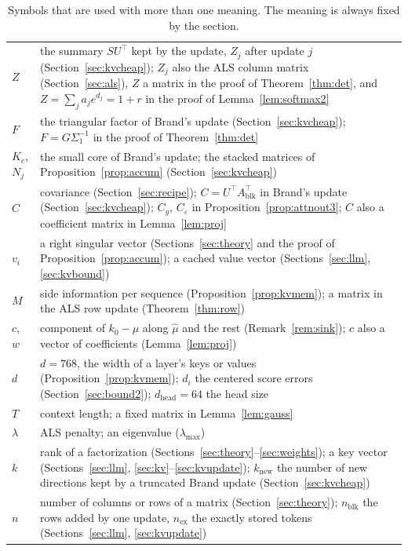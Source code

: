 \documentclass[10pt]{article}
\theoremstyle{plain}
\theoremstyle{definition}
\theoremstyle{remark}
\newcommand{\T}{^{\top}}
\newcommand{\dhead}{d_{\mathrm{head}}}
\begin{document}
\begin{table}[!htb]
\begin{tabularx}{\textwidth}{@{}>{\raggedright}p{1.6cm} >{\raggedright\arraybackslash}X@{}}
$Z$ & the summary $SU\T$ kept by the update, $Z_j$ after update $j$ (Section~\ref{sec:kvcheap}); $Z_j$ also the ALS column matrix (Section~\ref{sec:als}), $Z$ a matrix in the proof of Theorem~\ref{thm:det}, and $Z=\sum_ja_je^{d_j}=1+r$ in the proof of Lemma~\ref{lem:softmax2}\\
$F$ & the triangular factor of Brand's update (Section~\ref{sec:kvcheap}); $F=G\Sigma_1^{-1}$ in the proof of Theorem~\ref{thm:det}\\
$K_c$, $N_j$ & the small core of Brand's update; the stacked matrices of Proposition~\ref{prop:accum} (Section~\ref{sec:kvcheap})\\
$C$ & covariance (Section~\ref{sec:recipe}); $C=U\T A_{\mathrm{blk}}\T$ in Brand's update (Section~\ref{sec:kvcheap}); $C_y$, $C_\varepsilon$ in Proposition~\ref{prop:attnout3}; $C$ also a coefficient matrix in Lemma~\ref{lem:proj}\\
$v_i$ & a right singular vector (Sections~\ref{sec:theory} and the proof of Proposition~\ref{prop:accum}); a cached value vector (Sections~\ref{sec:llm}, \ref{sec:kvbound})\\
$M$ & side information per sequence (Proposition~\ref{prop:kvmem}); a matrix in the ALS row update (Theorem~\ref{thm:row})\\
$c$, $w$ & component of $k_0-\mu$ along $\hat\mu$ and the rest (Remark~\ref{rem:sink}); $c$ also a vector of coefficients (Lemma~\ref{lem:proj})\\
$d$ & $d=768$, the width of a layer's keys or values (Proposition~\ref{prop:kvmem}); $d_i$ the centered score errors (Section~\ref{sec:bound2}); $\dhead=64$ the head size\\
$T$ & context length; a fixed matrix in Lemma~\ref{lem:gauss}\\
$\lambda$ & ALS penalty; an eigenvalue ($\lambda_{\max}$)\\
$k$ & rank of a factorization (Sections~\ref{sec:theory}--\ref{sec:weights}); a key vector (Sections~\ref{sec:llm}, \ref{sec:kv}--\ref{sec:kvupdate}); $k_{\mathrm{new}}$ the number of new directions kept by a truncated Brand update (Section~\ref{sec:kvcheap})\\
$n$ & number of columns or rows of a matrix (Section~\ref{sec:theory}); $n_{\mathrm{blk}}$ the rows added by one update, $n_{\mathrm{ex}}$ the exactly stored tokens (Sections~\ref{sec:llm}, \ref{sec:kvupdate})\\
\bottomrule
\end{tabularx}
\caption{Symbols that are used with more than one meaning. The meaning is always fixed by the section.}
\label{tab:symbols}
\end{table}
\end{document}
